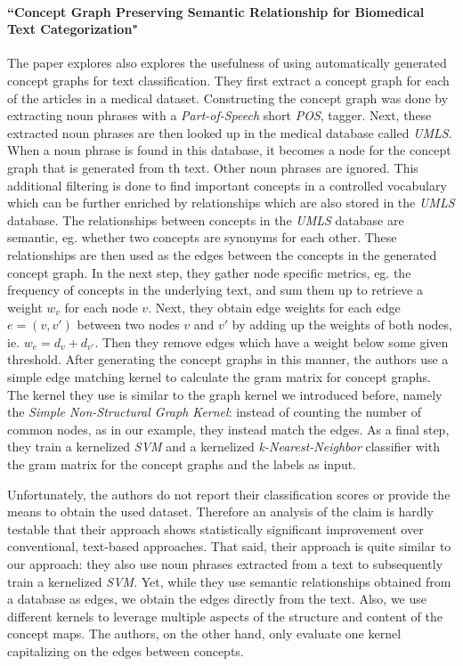 \paragraph{``Concept Graph Preserving Semantic Relationship for Biomedical Text Categorization" \cite{Gulrandhe2015}}
The paper explores also explores the usefulness of using automatically generated concept graphs for text classification.
They first extract a concept graph for each of the articles in a medical dataset. Constructing the concept graph was done by extracting noun phrases with a \textit{Part-of-Speech} short \textit{POS}, tagger.
Next, these extracted noun phrases are then looked up in the medical database called \textit{UMLS}. When a noun phrase is found in this database, it becomes a node for the concept graph that is generated from th text. Other noun phrases are ignored.
This additional filtering is done to find important concepts in a controlled vocabulary which can be further enriched by relationships which are also stored in the \textit{UMLS} database.
The relationships between concepts in the \textit{UMLS} database are semantic, eg. whether two concepts are synonyms for each other.
These relationships are then used as the edges between the concepts in the generated concept graph.
In the next step, they gather node specific metrics, eg. the frequency of concepts in the underlying text, and sum them up to retrieve a weight $w_v$ for each node $v$.
Next, they obtain edge weights for each edge $e = (v, v')$ between two nodes $v$ and $v'$ by adding up the weights of both nodes, ie. $w_e = d_v + d_{v'}$.
Then they remove edges which have a weight below some given threshold.
After generating the concept graphs in this manner, the authors use a simple edge matching kernel to calculate the gram matrix for concept graphs.
The kernel they use is similar to the graph kernel we introduced before, namely the \textit{Simple Non-Structural Graph Kernel}: instead of counting the number of common nodes, as in our example, they instead match the edges.
As a final step, they train a kernelized \textit{SVM} and a kernelized \textit{k-Nearest-Neighbor} classifier with the gram matrix for the concept graphs and the labels as input.

Unfortunately, the authors do not report their classification scores or provide the means to obtain the used dataset. 
Therefore an analysis of the claim is hardly testable that their approach shows statistically significant improvement over conventional, text-based approaches.
That said, their approach is quite similar to our approach: they also use noun phrases extracted from a text to subsequently train a kernelized \textit{SVM}.
Yet, while they use semantic relationships obtained from a database as edges, we obtain the edges directly from the text.
Also, we use different kernels to leverage multiple aspects of the structure and content of the concept maps. The authors, on the other hand, only evaluate one kernel capitalizing on the edges between concepts.

